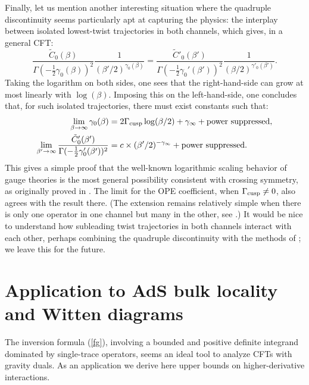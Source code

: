 \documentclass[11pt, reqno,preprint]{article}
\def\be{\begin{equation}}
\def\ee{\end{equation}}
\def\gammaE{\gamma_{\rm E}}
\begin{document}
Finally, let us mention another interesting situation where the quadruple discontinuity seems particularly
apt at capturing the physics: the interplay between isolated lowest-twist trajectories in both channels,
which gives, in a general CFT:
\be
\frac{\tilde{C}_0(\beta)}{\Gamma(-\tfrac12\gamma_0(\beta))^2}\frac{1}{(\beta'/2)^{\gamma_0(\beta)}}
=
\frac{\tilde{C}'_0(\beta')}{\Gamma(-\tfrac12\gamma_0'(\beta'))^2}\frac{1}{(\beta/2)^{\gamma'_0(\beta')}}.
\ee
Taking the logarithm on both sides, one sees that the right-hand-side can grow at most linearly with $\log(\beta)$.
Imposing this on the left-hand-side, one concludes that, for such isolated trajectories, there must exist constants such that:
\be\begin{aligned}
 \lim_{\beta\to \infty} \gamma_0(\beta) &= 2\Gamma_{\rm cusp}\log(\beta/2)+\gamma_\infty  +\mbox{power suppressed},
\\
 \lim_{\beta'\to \infty} \frac{\tilde{C}'_0(\beta')}{\Gamma(-\tfrac12\gamma_0'(\beta'))^2}
  &= c\times (\beta'/2)^{-\gamma_\infty} + \mbox{power suppressed}.
\end{aligned}\ee
This gives a simple proof that the well-known logarithmic scaling behavior of gauge theories is the most general possibility
consistent with crossing symmetry, as originally proved in \cite{Alday:2013cwa}.
The limit for the OPE coefficient, when $\Gamma_{\rm cusp}\neq 0$, also agrees with the result there.
(The extension remains relatively simple when there is only one operator in one channel but many in the other,
see \cite{Alday:2016mxe}.)  
It would be nice to understand how subleading twist trajectories in both channels interact with each other,
perhaps combining the quadruple discontinuity with the
methods of \cite{Alday:2016jfr,Alday:2016njk}; we leave this for the future.

\section{Application to AdS bulk locality and Witten diagrams}\label{sec:gravity}

The inversion formula (\ref{fg}), involving a bounded and positive definite integrand
dominated by single-trace operators, seems an ideal tool to analyze CFTs with gravity duals.
As an application we derive here upper bounds on higher-derivative interactions.
\end{document}
